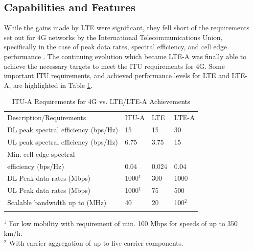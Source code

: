 \subsection{Capabilities and Features}

While the gains made by LTE were significant, they fell short of the requirements set out for 4G networks by the International Telecommunications Union, specifically in the case of peak data rates, spectral efficiency, and cell edge performance \cite{itu-advanced}.  The continuing evolution which became LTE-A was finally able to achieve the necessary targets to meet the ITU requirements for 4G.  Some important ITU requirements, and achieved performance levels for LTE and LTE-A, are highlighted in Table \ref{perf-table}.

\begin{table}
	\caption{ITU-A Requirements for 4G vs. LTE/LTE-A Achievements \cite{lte-3gpp}\cite{lteA-3gpp}\cite{itu-advanced}\cite{abdullah}}
	\label{perf-table}      
	\begin{tabular}{p{}p{}p{}p{}}
		\hline\noalign{\smallskip}
		Description/Requirements & ITU-A & LTE & LTE-A   \\
		\noalign{\smallskip}\svhline\noalign{\smallskip}
		DL peak spectral efficiency (bps/Hz) &  15   & 15  & 30 \\
		UL peak spectral efficiency (bps/Hz)& 6.75  & 3.75  & 15 \\
		Min. cell edge spectral \\ \hspace{0.8em} efficiency (bps/Hz) & 0.04 & 0.024 & 0.04 \\
		DL Peak data rates (Mbps) & 1000$^1$  & 300 & 1000 \\
		UL Peak data rates (Mbps) & 1000$^1$  & 75 & 500 \\
		Scalable bandwidth up to (MHz) & 40 & 20  & 100$^2$ \\
		
		\noalign{\smallskip}\hline\noalign{\smallskip}
	\end{tabular}
	$^1$ For low mobility with requirement of min. 100 Mbps for speeds of up to 350 km/h. 	 \\
	$^2$ With carrier aggregation of up to five carrier components.
\end{table}

